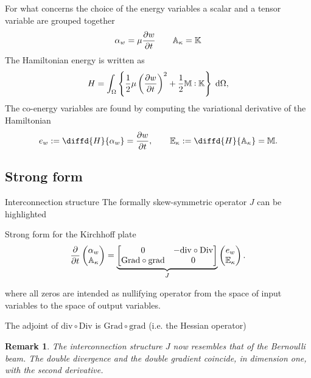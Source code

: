 \documentclass{beamer}
\newtheorem{remark}{Remark}
\def\onedot{$\mathsurround0pt\ldotp$}
\def\cddot{%
	\mathbin{\vcenter{\baselineskip.67ex
			\hbox{\onedot}\hbox{\onedot}}%
}}
\begin{document}
\begin{frame}
For what concerns the choice of the energy variables a scalar and a tensor variable are grouped together
\begin{equation*}
\alpha_w = \mu \diffp{w}{t} \qquad \mathbb{A}_{\kappa} = \mathbb{K} 
\end{equation*}	
The Hamiltonian energy is written as
\begin{equation*}
H = \int_{\Omega} \left\{ \frac{1}{2} \mu \left(\diffp{w}{t} \right)^2 + \frac{1}{2} \mathbb{M} \cddot \mathbb{K}  \right\}  \d{\Omega} ,
\end{equation*}
The co-energy variables are found by computing the variational derivative of the Hamiltonian
\begin{equation*}
e_w := \diffd{H}{\alpha_w} = \diffp{w}{t},  \qquad  \mathbb{E}_{\kappa} := \diffd{H}{\mathbb{A}_{\kappa}} = \mathbb{M}.
\end{equation*}
\end{frame}

\subsection{Strong form}

\begin{frame}{Interconnection structure}
The formally skew-symmetric operator $J$ can be highlighted 
\begin{exampleblock}{Strong form for the Kirchhoff plate}
\begin{equation*}
\diffp{}{t}
\begin{pmatrix}
\alpha_w \\
\mathbb{A}_{\kappa} \\
\end{pmatrix} = 
\underbrace{\begin{bmatrix}
	0  &  -  \mathrm{div} \circ \mathrm{Div} \\
	\mathrm{Grad} \circ \mathrm{grad} & 0 \\
	\end{bmatrix}}_{J}
\begin{pmatrix}
e_w \\
\mathbb{E}_{\kappa} \\
\end{pmatrix}.
\end{equation*}
\end{exampleblock}

where all zeros are intended as nullifying operator from the space of input variables to the space of output variables.
\begin{theorem}
	The adjoint of $\mathrm{div} \circ \mathrm{Div}$ is $\mathrm{Grad} \circ \mathrm{grad}$ (i.e. the Hessian operator)
\end{theorem}

\begin{remark}
	The interconnection structure $J$ now resembles that of the Bernoulli beam. The double divergence and the double gradient coincide, in dimension one, with the second derivative.
\end{remark}
\end{frame}
\end{document}
